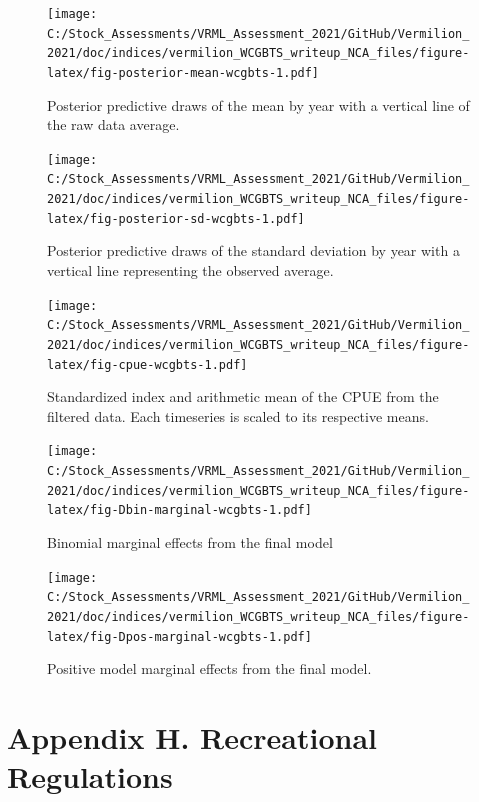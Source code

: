 \documentclass[11pt,
  english,
]{article}
\begin{document}
\begin{figure}
\centering
\texttt{[image: C:/Stock\_Assessments/VRML\_Assessment\_2021/GitHub/Vermilion\_2021/doc/indices/vermilion\_WCGBTS\_writeup\_NCA\_files/figure-latex/fig-posterior-mean-wcgbts-1.pdf]}
\caption{\label{fig:fig-posterior-mean-wcgbts}Posterior predictive draws of the mean by year with a vertical line of the raw data average.}
\end{figure}

\begin{figure}
\centering
\texttt{[image: C:/Stock\_Assessments/VRML\_Assessment\_2021/GitHub/Vermilion\_2021/doc/indices/vermilion\_WCGBTS\_writeup\_NCA\_files/figure-latex/fig-posterior-sd-wcgbts-1.pdf]}
\caption{\label{fig:fig-posterior-sd-wcgbts}Posterior predictive draws of the standard deviation by year with a vertical line representing the observed average.}
\end{figure}

\begin{figure}
\centering
\texttt{[image: C:/Stock\_Assessments/VRML\_Assessment\_2021/GitHub/Vermilion\_2021/doc/indices/vermilion\_WCGBTS\_writeup\_NCA\_files/figure-latex/fig-cpue-wcgbts-1.pdf]}
\caption{\label{fig:fig-cpue-wcgbts}Standardized index and arithmetic mean of the CPUE from the filtered data. Each timeseries is scaled to its respective means.}
\end{figure}

\begin{figure}
\centering
\texttt{[image: C:/Stock\_Assessments/VRML\_Assessment\_2021/GitHub/Vermilion\_2021/doc/indices/vermilion\_WCGBTS\_writeup\_NCA\_files/figure-latex/fig-Dbin-marginal-wcgbts-1.pdf]}
\caption{\label{fig:fig-Dbin-marginal-wcgbts}Binomial marginal effects from the final model}
\end{figure}

\begin{figure}
\centering
\texttt{[image: C:/Stock\_Assessments/VRML\_Assessment\_2021/GitHub/Vermilion\_2021/doc/indices/vermilion\_WCGBTS\_writeup\_NCA\_files/figure-latex/fig-Dpos-marginal-wcgbts-1.pdf]}
\caption{\label{fig:fig-Dpos-marginal-wcgbts}Positive model marginal effects from the final model.}
\end{figure}

\newpage


\hypertarget{appendix-h.-recreational-regulations}{%
\section*{Appendix H. Recreational Regulations}\label{appendix-h.-recreational-regulations}}
\end{document}
